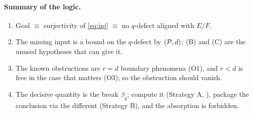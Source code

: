 \documentclass[11pt]{article}
\begin{document}
\paragraph{Summary of the logic.}
\begin{enumerate}
  \item Goal $\equiv$ surjectivity of \cref{eq:inj} $\equiv$ no $q$-defect
        aligned with $E/F$.
  \item The missing input is a bound on the $q$-defect by $(\mathcal{P},d)$; (B) and
        (C) are the unused hypotheses that can give it.
  \item The known obstructions are $r=d$ boundary phenomena (O1), and $r<d$ is
        free in the case that matters (O3); so the obstruction should vanish.
  \item The decisive quantity is the break $\beta_q$; compute it (Strategy A,
        ), package the conclusion via the different (Strategy B),
        and the absorption is forbidden.
\end{enumerate}

\printbibliography
\end{document}
